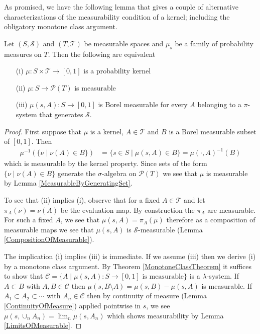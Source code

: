 As promised, we have the following lemma that gives a couple of
alternative characterizations of the measurability condition of a
kernel; including the obligatory monotone class argument.
\begin{lem}\label{KernelMeasurability}Let $(S, \mathcal{S})$ and $(T, \mathcal{T})$ be measurable
  spaces and $\mu_s$ be a family of probability measures on $T$.  Then
  the following are equivalent
\begin{itemize}
\item[(i)]$\mu : S \times \mathcal{T} \to [0,1]$ is a probability kernel
\item[(ii)]$\mu : S \to \mathcal{P}(T)$ is measurable
\item[(iii)]$\mu(s, A) : S \to [0,1]$ is Borel measurable for every $A$
  belonging to a $\pi$-system that generates $\mathcal{S}$.
\end{itemize}
\end{lem}
\begin{proof}
First suppose that $\mu$ is a kernel, $A \in \mathcal{T}$
and $B$ is a Borel
measurable subset of $[0,1]$.  Then 
\begin{align*}
\mu^{-1}(\lbrace \nu \mid \nu(A)
\in B \rbrace) &= \lbrace s \in S \mid \mu(s,A) \in B \rbrace =
\mu(\cdot, A)^{-1}(B)
\end{align*}
which is measurable by the kernel property.  Since sets of the form $\lbrace \nu \mid \nu(A)
\in B \rbrace$ generate the $\sigma$-algebra on $\mathcal{P}(T)$ we
see that $\mu$ is measurable by Lemma \ref{MeasurableByGeneratingSet}.

To see that (ii) implies (i), observe that for a fixed $A \in
\mathcal{T}$ and let $\pi_A(\nu) = \nu(A)$ be the evaluation map.  By
construction the $\pi_A$ are measurable.  For such a fixed $A$, we see
that $\mu(s, A) = \pi_A(\mu)$ therefore as a composition of measurable
maps we see that $\mu(s,A)$ is $\mathcal{S}$-measurable (Lemma
\ref{CompositionOfMeasurable}).

The implication (i) implies (iii) is immediate.  If we assume (iii)
then we derive (i) by a monotone class argument.  By Theorem
\ref{MonotoneClassTheorem} it suffices to show that $\mathcal{C} =
\lbrace A \mid \mu(s, A) : S \to [0,1] \text { is measurable}\rbrace$
is a $\lambda$-system.  If $A \subset B$ with $A,B \in \mathcal{C}$
then $\mu(s, B \setminus A) = \mu(s, B) - \mu(s,A)$ is measurable.  If
$A_1 \subset A_2 \subset \cdots$ with $A_n \in \mathcal{C}$ then by
continuity of measure (Lemma \ref{ContinuityOfMeasure}) applied
pointwise in $s$, we see $\mu(s, \cup_n A_n) = \lim_n \mu(s, A_n)$
which shows measurability by Lemma \ref{LimitsOfMeasurable}.
\end{proof}

